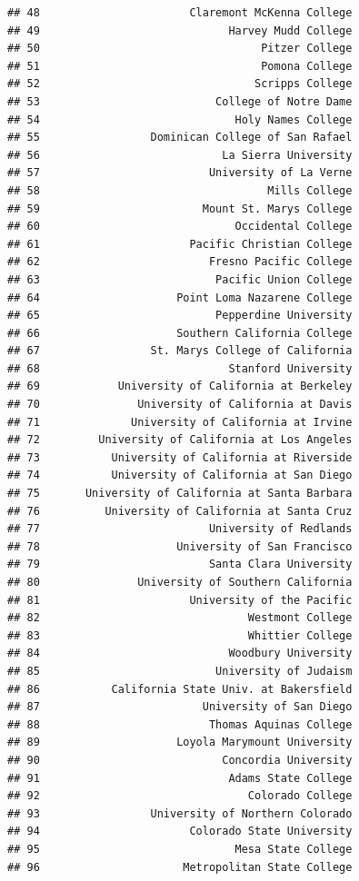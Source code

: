 \documentclass[]{article}
\begin{document}
\begin{verbatim}
## 48                       Claremont McKenna College
## 49                             Harvey Mudd College
## 50                                  Pitzer College
## 51                                  Pomona College
## 52                                 Scripps College
## 53                           College of Notre Dame
## 54                              Holy Names College
## 55                 Dominican College of San Rafael
## 56                            La Sierra University
## 57                          University of La Verne
## 58                                   Mills College
## 59                         Mount St. Marys College
## 60                              Occidental College
## 61                       Pacific Christian College
## 62                          Fresno Pacific College
## 63                           Pacific Union College
## 64                     Point Loma Nazarene College
## 65                           Pepperdine University
## 66                     Southern California College
## 67                 St. Marys College of California
## 68                             Stanford University
## 69            University of California at Berkeley
## 70               University of California at Davis
## 71              University of California at Irvine
## 72         University of California at Los Angeles
## 73           University of California at Riverside
## 74           University of California at San Diego
## 75       University of California at Santa Barbara
## 76          University of California at Santa Cruz
## 77                          University of Redlands
## 78                     University of San Francisco
## 79                          Santa Clara University
## 80               University of Southern California
## 81                       University of the Pacific
## 82                                Westmont College
## 83                                Whittier College
## 84                             Woodbury University
## 85                           University of Judaism
## 86           California State Univ. at Bakersfield
## 87                         University of San Diego
## 88                          Thomas Aquinas College
## 89                     Loyola Marymount University
## 90                            Concordia University
## 91                             Adams State College
## 92                                Colorado College
## 93                 University of Northern Colorado
## 94                       Colorado State University
## 95                              Mesa State College
## 96                      Metropolitan State College

\end{verbatim}
\end{document}
